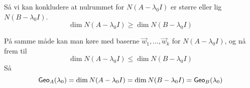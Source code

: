 \begin{bevis}
\begin{enumerate}[1.]
		Så vi kan konkludere at nulrummet for $N(A-\lambda_0 I)$ er større eller
		lig $N(B-\lambda_0 I)$.
		\[
			\dim N(A-\lambda_0I) \ge \dim N(B-\lambda_0I)
		\]

		På samme måde kan man køre med baserne $\vec{w}_1,\dotsc, \vec{w}_k$
		for $N(A-\lambda_0I)$, og nå frem til
		\[
			\dim N(A-\lambda_0I) \le \dim N(B-\lambda_0I)
		\]
		Så
		\[
			\textsf{Geo}_{A}(\lambda_0) =
			\dim N(A-\lambda_0I) =
			\dim N(B-\lambda_0I) =
			\textsf{Geo}_{B}(\lambda_0)
		\]
	\end{enumerate}
\end{bevis}
